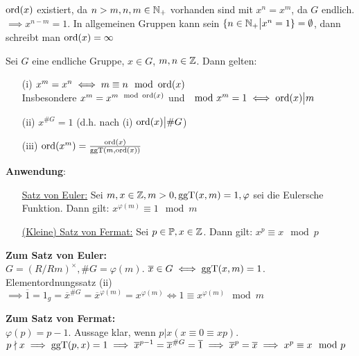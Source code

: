 \documentclass[a4paper,DIV15,BCOR12mm]{article}
\begin{document}
\begin{bemerkung}
    $\mathop{\rm ord}\nolimits(x)$ existiert, da $n > m, n,m \in \mathbb{N}_+$ vorhanden sind mit $x^n = x^m$, da $G$ endlich. $\implies x^{n-m} = 1$. In allgemeinen Gruppen kann sein $\{n \in \mathbb{N}_+ \big| x^n = 1\} = \emptyset$, dann schreibt man $\mathop{\rm ord}\nolimits(x) = \infty$
\end{bemerkung}

\begin{satz}[Elementordnungssatz]
    Sei $G$ eine endliche Gruppe, $x \in G$, $m, n \in \mathbb{Z}$. Dann gelten:
    \begin{itemize}
        \item[(i)] $x^m = x^n \iff m \equiv n \mod {\mathop{\rm ord}\nolimits}(x)$\\
        Insbesondere $x^m = x^{m \mod {\mathop{\rm ord}\nolimits}(x)}$ und $\mod x^m = 1 \iff \mathop{\rm ord}\nolimits(x) \big| m$
        \item[(ii)] $x^{\# G} = 1$ (d.h. nach (i) $\mathop{\rm ord}\nolimits(x) \big| \# G$)
        \item[(iii)] $\mathop{\rm ord}\nolimits(x^m) = \frac{\mathop{\rm ord}\nolimits(x)}{\mathop{\rm ggT}\nolimits (m, \mathop{\rm ord}\nolimits(x))}$
    \end{itemize}
\end{satz}

\textbf{Anwendung}:
\begin{itemize}
    \item[] \underline{Satz von Euler:} Sei $m, x \in \mathbb{Z}, m > 0, \mathop{\rm ggT}\nolimits (x,m) = 1, \varphi$ sei die Eulersche Funktion. Dann gilt: $x^{\varphi(m)} \equiv 1 \mod m$
    \item[] \underline{(Kleine) Satz von Fermat:} Sei $p \in \mathbb{P}, x \in \mathbb{Z}$. Dann gilt: $x^p \equiv x \mod p$
\end{itemize}

\textbf{Zum Satz von Euler:}\\
$G = (R/Rm)^\times, \# G = \varphi(m)$. $\overline x \in G \iff
\mathop{\rm ggT}\nolimits(x,m) = 1$. Elementordnungssatz (ii) $\implies \overline 1 = 1_g
= \overline x^{\# G} = \overline x^{\varphi(m)} = x^{\varphi(m)}
\iff 1 \equiv x^{\varphi(m)} \mod m$

\textbf{Zum Satz von Fermat:}\\
$\varphi(p) = p-1$. Aussage klar, wenn $p \big| x (x \equiv 0 \equiv
xp)$. $p \nmid x \implies \mathop{\rm ggT}\nolimits(p,x) = 1 \implies \overline x^{p-1} =
\overline x^{\# G} = \overline 1 \implies \overline x^p = \overline
x \implies x^p \equiv x \mod p$
\end{document}
